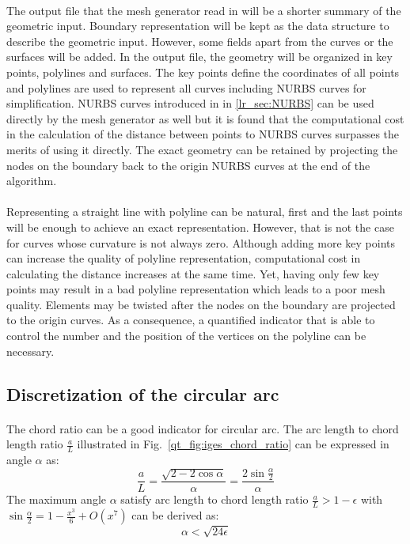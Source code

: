 \paragraph{}
The output file that the mesh generator read in will be a shorter summary of the geometric input.
Boundary representation will be kept as the data structure to describe the geometric input.
However, some fields apart from the curves or the surfaces will be added.
In the output file, the geometry will be organized in key points, polylines and surfaces.
The key points define the coordinates of all points and polylines are used to represent all curves including NURBS curves for simplification.
NURBS curves introduced in in \ref{lr_sec:NURBS} can be used directly by the mesh generator as well but it is found that the computational cost in the calculation of the distance between points to NURBS curves surpasses the merits of using it directly.
The exact geometry can be retained by projecting the nodes on the boundary back to the origin NURBS curves at the end of the algorithm.

\paragraph{}
Representing a straight line with polyline can be natural, first and the last points will be enough to achieve an exact representation.
However, that is not the case for curves whose curvature is not always zero.
Although adding more key points can increase the quality of polyline representation, computational cost in calculating the distance increases at the same time.
Yet, having only few key points may result in a bad polyline representation which leads to a poor mesh quality.
Elements may be twisted after the nodes on the boundary are projected to the origin curves.
As a consequence, a quantified indicator that is able to control the number and the position of the vertices on the polyline can be necessary.

\subsection{Discretization of the circular arc}
\paragraph{}
The chord ratio can be a good indicator for circular arc.
The arc length to chord length ratio $\frac{a}{L}$ illustrated in Fig.~\ref{qt_fig:iges_chord_ratio} can be expressed in angle $\alpha$ as:
    \begin{equation}
        \frac{a}{L} = \frac{
            \sqrt{2-2\cos\alpha}
        }{\alpha}
        = \frac{
            2\sin\frac{\alpha}{2}
        }{\alpha}
    \end{equation}
%
The maximum angle $\alpha$ satisfy arc length to chord length ratio $\frac{a}{L} > 1-\epsilon$ with $
    \sin\frac{\alpha}{2} = 1 - \frac{x^3}{6} + O(x^7)
$ can be derived as:
    \begin{equation}
        \alpha < \sqrt{24 \epsilon}
    \end{equation}

